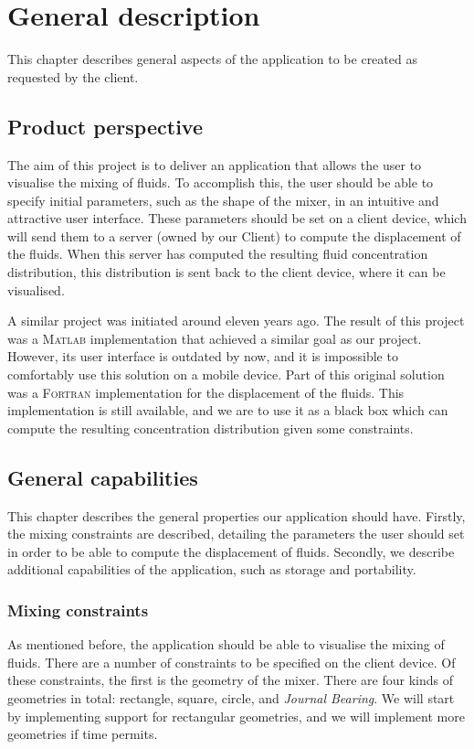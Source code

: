 \chapter{General description}
This chapter describes general aspects of the application to be created as requested by the client.

\section{Product perspective} %
The aim of this project is to deliver an application that allows the user to visualise the mixing of fluids. To accomplish this, the user should be able to specify initial parameters, such as the shape of the mixer, in an intuitive and attractive user interface. These parameters should be set on a client device, which will send them to a server (owned by our Client) to compute the displacement of the fluids. When this server has computed the resulting fluid concentration distribution, this distribution is sent back to the client device, where it can be visualised.

A similar project was initiated around eleven years ago. The result of this project was a \textsc{Matlab} implementation that achieved a similar goal as our project. However, its user interface is outdated by now, and it is impossible to comfortably use this solution on a mobile device. Part of this original solution was a \textsc{Fortran} implementation for the displacement of the fluids. This implementation is still available, and we are to use it as a black box which can compute the resulting concentration distribution given some constraints.

\section{General capabilities}
This chapter describes the general properties our application should have. Firstly, the mixing constraints are described, detailing the parameters the user should set in order to be able to compute the displacement of fluids. Secondly, we describe additional capabilities of the application, such as storage and portability.

\subsection{Mixing constraints}\label{mixingconstraints}
As mentioned before, the application should be able to visualise the mixing of fluids. There are a number of constraints to be specified on the client device. Of these constraints, the first is the geometry of the mixer. There are four kinds of geometries in total: rectangle, square, circle, and \emph{Journal Bearing}. We will start by implementing support for rectangular geometries, and we will implement more geometries if time permits.

